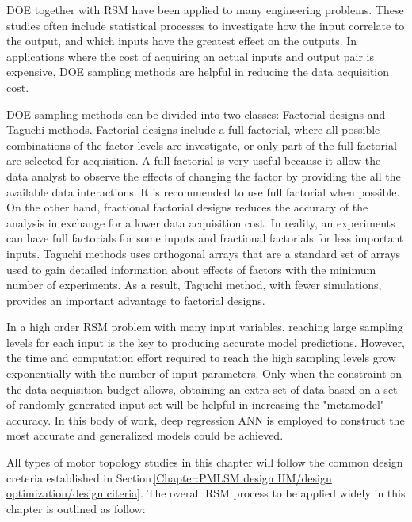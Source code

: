     
        \acf{DOE} together with \ac{RSM} have been applied to many engineering problems. These studies often include statistical processes to investigate how the input correlate to the output, and which inputs have the greatest effect on the outputs. In applications where the cost of acquiring an actual inputs and output pair is expensive, \ac{DOE} sampling methods are helpful in reducing the data acquisition cost. 
        
        
        \ac{DOE} sampling methods can be divided into two classes: Factorial designs and Taguchi methods. Factorial designs include a full factorial, where all possible combinations of the factor levels are investigate, or only part of the full factorial are selected for acquisition. A full factorial is very useful because it allow the data analyst to observe the effects of changing the factor by providing the all the available data interactions. It is recommended to use full factorial when possible. On the other hand, fractional factorial designs reduces the accuracy of the analysis in exchange for a lower data acquisition cost. In reality, an experiments can have full factorials for some inputs and fractional factorials for less important inputs. Taguchi methods uses orthogonal arrays that are a standard set of arrays used to gain detailed information about effects of factors with the minimum number of experiments. As a result, Taguchi method, with fewer simulations, provides an important advantage to factorial designs. 
        
        
        In a high order \ac{RSM} problem  with many input variables, reaching large sampling levels for each input is the key to producing accurate model predictions. However, the time and computation effort required to reach the high sampling levels grow exponentially with the number of input parameters. Only when the constraint on the data acquisition budget allows, obtaining an extra set of data based on a set of randomly generated input set will be helpful in increasing the "metamodel" accuracy. In this body of work, deep regression \acf{ANN} is employed to construct the most accurate and generalized models could be achieved.
        
        
        All types of motor topology studies in this chapter will follow the common design creteria established in Section\,\ref{Chapter:PMLSM design HM/design optimization/design citeria}. The overall \ac{RSM} process to be applied widely in this chapter is outlined as follow:
        
